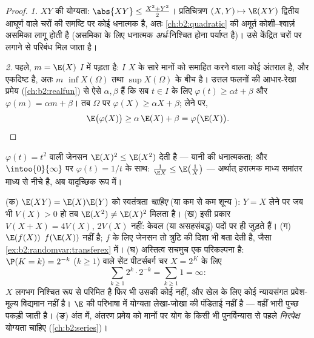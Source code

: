 \begin{proof}
\emph{1.} $XY$ की योग्यता: $\abs{XY} \leq \frac{X^2 + Y^2}2$। प्रतिचित्रण $(X, Y) \mapsto \E(XY)$ द्वितीय आघूर्ण
वाले चरों की समष्टि पर कोई धनात्मक  है, अतः \cref{ch:b2:quadratic}
की अमूर्त कोशी--श्वार्ज़ असमिका लागू होती है (असमिका के लिए धनात्मक
\emph{अर्ध}-निश्चित होना पर्याप्त है)। उसे केंद्रित चरों पर लगाने
से  परिबंध मिल जाता है।

\emph{2.} पहले, $m = \E(X)$ $I$ में पड़ता है: $I$ $X$ के सारे मानों को
समाहित करने वाला कोई अंतराल है, और  एकदिष्ट है, अतः $m$
$\inf X(\Omega)$ तथा $\sup X(\Omega)$ के बीच है। उत्तल फलनों की आधार-रेखा प्रमेय (\cref{ch:b2:realfun}) से
ऐसे $\alpha, \beta$ हैं कि सब $t \in I$ के लिए $\varphi(t) \geq \alpha t + \beta$ और $\varphi(m) = \alpha m + \beta$। तब $\Omega$ पर 
$\varphi(X) \geq \alpha X + \beta$;  लेने पर,
\[
\E\bigl(\varphi(X)\bigr) \geq \alpha\,\E(X) + \beta
= \varphi\bigl(\E(X)\bigr). \qedhere
\]
\end{proof}

\begin{example}
$\varphi(t) = t^2$ वाली जेनसन $\E(X)^2 \leq \E(X^2)$ देती है --- यानी  की धनात्मकता; और $\intoo{0}{\infty}$
पर $\varphi(t) = 1/t$ के साथ: $\frac{1}{\E X} \leq \E\bigl(\frac1X\bigr)$ --- अर्थात् हरात्मक माध्य समांतर माध्य से नीचे
है, अब यादृच्छिक रूप में।
\end{example}

\begin{remark}[सामान्य चूकें]
(क) $\E(XY) = \E(X)\E(Y)$ को स्वतंत्रता \emph{चाहिए} (या कम से कम शून्य ):
$Y = X$ लेने पर जब भी $V(X) > 0$ हो तब $\E(X^2) \neq
\E(X)^2$ मिलता है। (ख) इसी प्रकार $V(X + X) =
4V(X)$, $2V(X)$
नहीं:  केवल  (या असहसंबद्ध) पदों पर ही जुड़ते हैं।
(ग) $\E(f(X))$ $f(\E(X))$ नहीं है;  $f$ के लिए जेनसन तो त्रुटि की दिशा भी
बता देती है, जैसा \cref{ex:b2:randomvar:transferex} में। (घ) अस्तित्व सचमुच एक परिकल्पना है:
$\P(K = k) = 2^{-k}$ ($k \geq 1$) वाले सेंट पीटर्सबर्ग चर $X = 2^K$ के लिए
\[
\sum_{k\geq1}2^k\cdot2^{-k} = \sum_{k\geq1}1 = \infty :
\]
$X$ लगभग निश्चित रूप से परिमित है फिर भी उसकी कोई  नहीं,
और खेल के लिए कोई न्यायसंगत प्रवेश-मूल्य विद्यमान नहीं है। $\E$ की
परिभाषा में योग्यता लेखा-जोखा की पंडिताई नहीं है --- वहीं भारी
पुच्छ पकड़ी जाती है। (ङ) अंत में, अंतरण प्रमेय को मानों पर योग के
किसी भी पुनर्विन्यास से पहले \emph{निरपेक्ष} योग्यता चाहिए (\cref{ch:b2:series})।
\end{remark}


